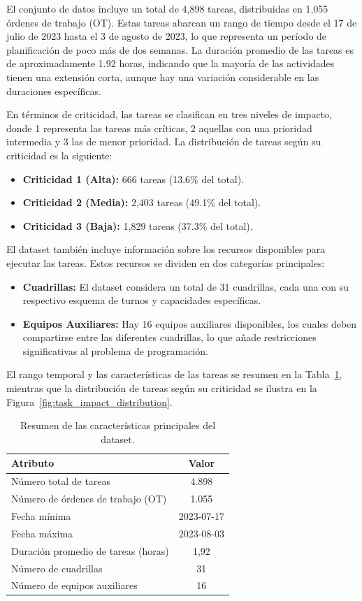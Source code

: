 \documentclass{article}
\begin{document}
El conjunto de datos incluye un total de 4,898 tareas, distribuidas en 1,055 órdenes de trabajo (OT). Estas tareas abarcan un rango de tiempo desde el 17 de julio de 2023 hasta el 3 de agosto de 2023, lo que representa un período de planificación de poco más de dos semanas. La duración promedio de las tareas es de aproximadamente 1.92 horas, indicando que la mayoría de las actividades tienen una extensión corta, aunque hay una variación considerable en las duraciones específicas.

En términos de criticidad, las tareas se clasifican en tres niveles de impacto, donde 1 representa las tareas más críticas, 2 aquellas con una prioridad intermedia y 3 las de menor prioridad. La distribución de tareas según su criticidad es la siguiente:
\begin{itemize}
    \item \textbf{Criticidad 1 (Alta):} 666 tareas (13.6\% del total).
    \item \textbf{Criticidad 2 (Media):} 2,403 tareas (49.1\% del total).
    \item \textbf{Criticidad 3 (Baja):} 1,829 tareas (37.3\% del total).
\end{itemize}

El dataset también incluye información sobre los recursos disponibles para ejecutar las tareas. Estos recursos se dividen en dos categorías principales:
\begin{itemize}
    \item \textbf{Cuadrillas:} El dataset considera un total de 31 cuadrillas, cada una con su respectivo esquema de turnos y capacidades específicas.
    \item \textbf{Equipos Auxiliares:} Hay 16 equipos auxiliares disponibles, los cuales deben compartirse entre las diferentes cuadrillas, lo que añade restricciones significativas al problema de programación.
\end{itemize}

El rango temporal y las características de las tareas se resumen en la Tabla~\ref{tab:dataset_summary}, mientras que la distribución de tareas según su criticidad se ilustra en la Figura~\ref{fig:task_impact_distribution}.

\begin{table}[H]
    \centering
    \begin{tabular}{lc}
        \toprule
        \textbf{Atributo} & \textbf{Valor} \\
        \midrule
        Número total de tareas & 4.898 \\
        Número de órdenes de trabajo (OT) & 1.055 \\
        Fecha mínima & 2023-07-17 \\
        Fecha máxima & 2023-08-03 \\
        Duración promedio de tareas (horas) & 1,92 \\
        Número de cuadrillas & 31 \\
        Número de equipos auxiliares & 16 \\
        \bottomrule
    \end{tabular}
    \caption{Resumen de las características principales del dataset.}
    \label{tab:dataset_summary}
\end{table}
\end{document}
